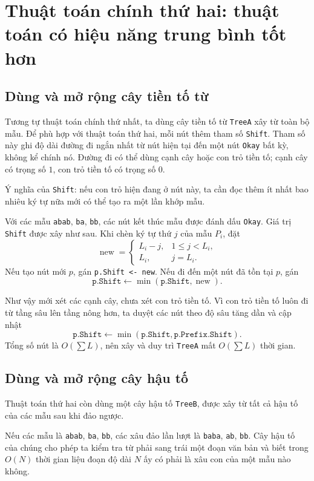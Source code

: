 \documentclass[11pt]{article}
\begin{document}
\section{Thuật toán chính thứ hai: thuật toán có hiệu năng trung bình tốt hơn}

\subsection{Dùng và mở rộng cây tiền tố từ}

Tương tự thuật toán chính thứ nhất, ta dùng cây tiền tố từ \texttt{TreeA} xây
từ toàn bộ mẫu. Để phù hợp với thuật toán thứ hai, mỗi nút thêm tham số
\texttt{Shift}. Tham số này ghi độ dài đường đi ngắn nhất từ nút hiện tại đến
một nút \texttt{Okay} bất kỳ, không kể chính nó. Đường đi có thể dùng cạnh cây
hoặc con trỏ tiền tố; cạnh cây có trọng số $1$, con trỏ tiền tố có trọng số
$0$.

Ý nghĩa của \texttt{Shift}: nếu con trỏ hiện đang ở nút này, ta cần đọc thêm
ít nhất bao nhiêu ký tự nữa mới có thể tạo ra một lần khớp mẫu.

Với các mẫu \texttt{abab}, \texttt{ba}, \texttt{bb}, các nút kết thúc mẫu được
đánh dấu \texttt{Okay}. Giá trị \texttt{Shift} được xây như sau. Khi chèn ký
tự thứ $j$ của mẫu $P_i$, đặt
\[
  \operatorname{new}=
  \begin{cases}
    L_i-j, & 1\le j<L_i,\\
    L_i, & j=L_i.
  \end{cases}
\]
Nếu tạo nút mới $p$, gán \texttt{p.Shift <- new}. Nếu đi đến một nút đã tồn
tại $p$, gán
\[
  \texttt{p.Shift}\leftarrow
  \min(\texttt{p.Shift},\operatorname{new}).
\]

Như vậy mới xét các cạnh cây, chưa xét con trỏ tiền tố. Vì con trỏ tiền tố
luôn đi từ tầng sâu lên tầng nông hơn, ta duyệt các nút theo độ sâu tăng dần
và cập nhật
\[
  \texttt{p.Shift}\leftarrow
  \min(\texttt{p.Shift},\texttt{p.Prefix.Shift}).
\]
Tổng số nút là $O(\sum L)$, nên xây và duy trì \texttt{TreeA} mất
$O(\sum L)$ thời gian.

\subsection{Dùng và mở rộng cây hậu tố}

Thuật toán thứ hai còn dùng một cây hậu tố \texttt{TreeB}, được xây từ tất cả
hậu tố của các mẫu sau khi đảo ngược.

Nếu các mẫu là \texttt{abab}, \texttt{ba}, \texttt{bb}, các xâu đảo lần lượt
là \texttt{baba}, \texttt{ab}, \texttt{bb}. Cây hậu tố của chúng cho phép ta
kiểm tra từ phải sang trái một đoạn văn bản và biết trong $O(N)$ thời gian
liệu đoạn độ dài $N$ ấy có phải là xâu con của một mẫu nào không.
\end{document}
